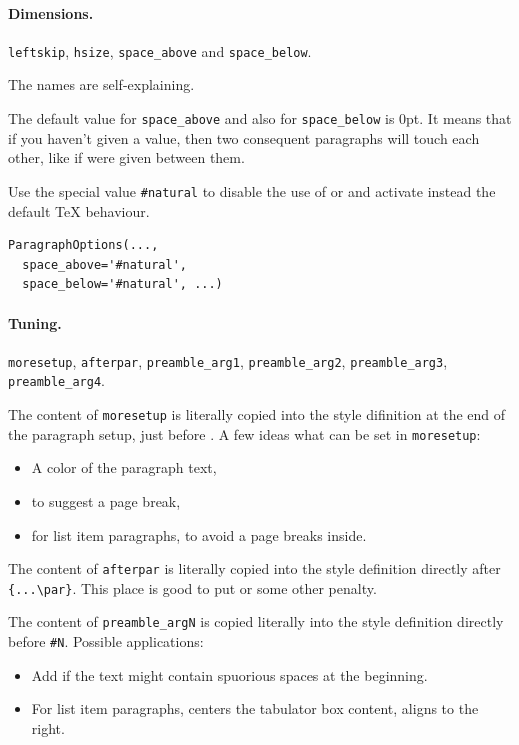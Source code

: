 \documentclass[]{ltugboat}
\begin{document}
\paragraph{Dimensions.} \verb|leftskip|, \verb|hsize|, \verb|space_above| and \verb|space_below|.

The names are self-explaining.

The default value for \verb|space_above| and also for \verb|space_below| is 0pt. It means that if you haven't given a value, then two consequent paragraphs will touch each other, like if  were given between them.

Use the special value \verb|#natural| to disable the use of  or  and activate instead the default \TeX{} behaviour.

\begin{verbatim}
ParagraphOptions(...,
  space_above='#natural',
  space_below='#natural', ...)
\end{verbatim}

\paragraph{Tuning.} \verb|moresetup|, \verb|afterpar|, \verb|preamble_arg1|, \verb|preamble_arg2|, \verb|preamble_arg3|, \verb|preamble_arg4|.

The content of \verb|moresetup| is literally copied into the style difinition at the end of the paragraph setup, just before . A few ideas what can be set in \verb|moresetup|:

\begin{itemize}
\item A color of the paragraph text,
\item {} to suggest a page break,
\item {} for list item paragraphs, to avoid a page breaks inside.
\end{itemize}

The content of \verb|afterpar| is literally copied into the style definition directly after \verb|{...\par}|. This place is good to put  or some other penalty.

The content of \verb|preamble_argN| is copied literally into the style definition directly before \verb|#N|. Possible applications:

\begin{itemize}
\item Add  if the text might contain spuorious spaces at the beginning.
\item For list item paragraphs,  centers the tabulator box content,  aligns to the right.
\end{itemize}
\end{document}
